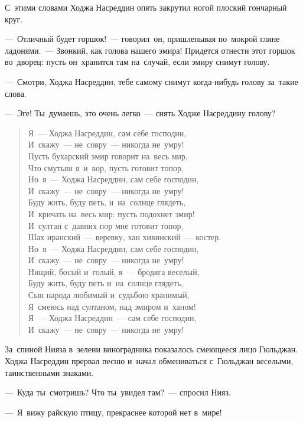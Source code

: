 \documentclass[12pt,a4paper]{book}
\begin{document}
С~этими словами Ходжа Насреддин опять закрутил ногой плоский гончарный круг.

—~Отличный будет горшок!~— говорил~он, пришлепывая по~мокрой глине ладонями.~— Звонкий, как голова нашего эмира! Придется отнести этот горшок во~дворец: пусть он~хранится там на~случай, если эмиру снимут голову.

—~Смотри, Ходжа Насреддин, тебе самому снимут когда-нибудь голову за~такие слова.

—~Эге! Ты~думаешь, это очень легко~— снять Ходже Насреддину голову?

\begin{verse}
Я~— Ходжа Насреддин, сам себе господин, \\
И~скажу~— не~совру~— никогда не~умру! \\
Пусть бухарский эмир говорит на~весь мир, \\
Что смутьян я~и~вор, пусть готовит топор, \\
Но~я~— Ходжа Насреддин, сам себе господин, \\
И~скажу~— не~совру~— никогда не~умру! \\
Буду жить, буду петь, и~на~солнце глядеть, \\
И~кричать на~весь мир: пусть подохнет эмир! \\
И~султан с~давних пор мне готовит топор, \\
Шах иранский~— веревку, хан хивинский~— костер. \\
Но~я~— Ходжа Насреддин, сам себе господин, \\
И~скажу~— не~совру~— никогда не~умру! \\
Нищий, босый и~голый, я~— бродяга веселый, \\
Буду жить, буду петь и~на~солнце глядеть, \\
Сын народа любимый и~судьбою хранимый, \\
Я~смеюсь над султаном, над эмиром и~ханом! \\
Я~— Ходжа Насреддин~— сам себе господин, \\
И~скажу~— не~совру~— никогда не~умру!
\end{verse}

За~спиной Нияза в~зелени виноградника показалось смеющееся лицо Гюльджан. Ходжа Насреддин прервал песню и~начал обмениваться с~Гюльджан веселыми, таинственными знаками.

—~Куда ты~смотришь? Что ты~увидел там?~— спросил Нияз.

—~Я~вижу райскую птицу, прекраснее которой нет в~мире!
\end{document}
